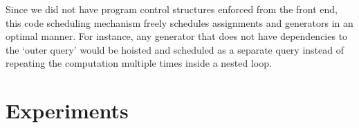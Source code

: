 \documentclass[runningheads]{llncs}
\begin{document}
Since we did not have program control structures enforced from the front end,
this code scheduling mechanism freely schedules assignments and generators
in an optimal manner.
For instance, any generator that does not have dependencies to the `outer query'
would be hoisted and scheduled as a separate query instead of repeating the
computation multiple times inside a nested loop.






\vspace{-4mm}
\section{Experiments}\label{sec:experiments}
\vspace{-3mm}

\end{document}
